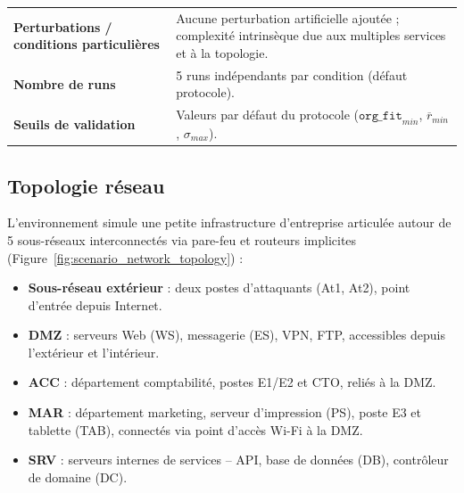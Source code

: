 \begin{table}[h!]
{\begin{tabular}{p{5cm}p{8.5cm}}
      \textbf{Perturbations / conditions particulières} & Aucune perturbation artificielle ajoutée ; complexité intrinsèque due aux multiples services et à la topologie.                                                                                                                                                                                                                                                  \\

      \textbf{Nombre de runs}                           & 5 runs indépendants par condition (défaut protocole).                                                                                                                                                                                                                                                                                                            \\

      \textbf{Seuils de validation}                     & Valeurs par défaut du protocole (\(\texttt{org\_fit}_{min}\), \(\overline{r}_{min}\), \(\sigma_{max}\)).                                                                                                                                                                                                                                                         \\
      \hline
    \end{tabular}
  }
\end{table}

\subsection{Topologie réseau}
\label{subsec:enterprise_topology}
L’environnement simule une petite infrastructure d’entreprise articulée autour de 5 sous-réseaux interconnectés via pare-feu et routeurs implicites (Figure~\ref{fig:scenario_network_topology}) :
\begin{itemize}
  \item \textbf{Sous-réseau extérieur} : deux postes d’attaquants (At1, At2), point d’entrée depuis Internet.
  \item \textbf{DMZ} : serveurs Web (WS), messagerie (ES), VPN, FTP, accessibles depuis l’extérieur et l’intérieur.
  \item \textbf{ACC} : département comptabilité, postes E1/E2 et CTO, reliés à la DMZ.
  \item \textbf{MAR} : département marketing, serveur d’impression (PS), poste E3 et tablette (TAB), connectés via point d’accès Wi-Fi à la DMZ.
  \item \textbf{SRV} : serveurs internes de services -- API, base de données (DB), contrôleur de domaine (DC).
\end{itemize}

